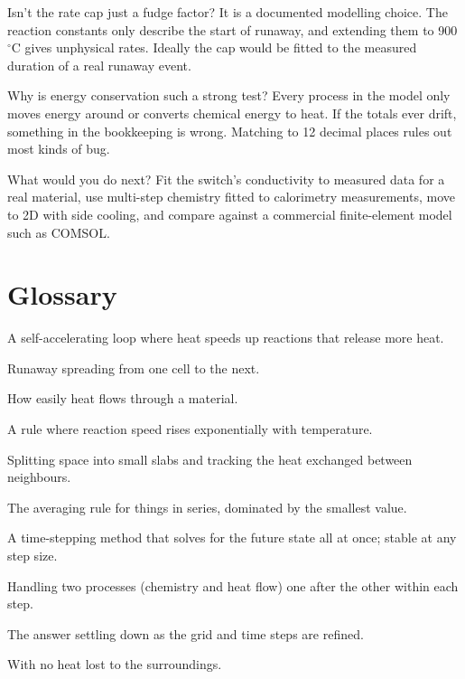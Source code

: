 \documentclass[11pt]{article}
\begin{document}
\begin{qa}{Isn't the rate cap just a fudge factor?}
It is a documented modelling choice. The reaction constants only describe the start of
runaway, and extending them to 900\,$^\circ$C gives unphysical rates. Ideally the cap would
be fitted to the measured duration of a real runaway event.
\end{qa}

\begin{qa}{Why is energy conservation such a strong test?}
Every process in the model only moves energy around or converts chemical energy to heat.
If the totals ever drift, something in the bookkeeping is wrong. Matching to 12 decimal
places rules out most kinds of bug.
\end{qa}

\begin{qa}{What would you do next?}
Fit the switch's conductivity to measured data for a real material, use multi-step
chemistry fitted to calorimetry measurements, move to 2D with side cooling, and compare
against a commercial finite-element model such as COMSOL.
\end{qa}

\section*{Glossary}

\begin{description}[leftmargin=1.2em,style=nextline]
  \item[Thermal runaway] A self-accelerating loop where heat speeds up reactions that
        release more heat.
  \item[Propagation] Runaway spreading from one cell to the next.
  \item[Thermal conductivity ($k$)] How easily heat flows through a material.
  \item[Arrhenius law] A rule where reaction speed rises exponentially with temperature.
  \item[Finite-volume method] Splitting space into small slabs and tracking the heat
        exchanged between neighbours.
  \item[Harmonic mean] The averaging rule for things in series, dominated by the smallest
        value.
  \item[Backward Euler (implicit)] A time-stepping method that solves for the future
        state all at once; stable at any step size.
  \item[Operator splitting] Handling two processes (chemistry and heat flow) one after
        the other within each step.
  \item[Convergence] The answer settling down as the grid and time steps are refined.
  \item[Adiabatic] With no heat lost to the surroundings.
\end{description}
\end{document}
